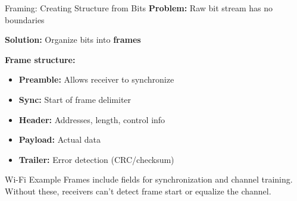 \documentclass[aspectratio=169,11pt]{beamer}
\begin{document}
\begin{frame}{Framing: Creating Structure from Bits}
    \textbf{Problem:} Raw bit stream has no boundaries
    
    \textbf{Solution:} Organize bits into \textbf{frames}
    
    \vspace{0.3cm}
    \textbf{Frame structure:}
    \begin{itemize}
        \item \textbf{Preamble:} Allows receiver to synchronize
        \item \textbf{Sync:} Start of frame delimiter
        \item \textbf{Header:} Addresses, length, control info
        \item \textbf{Payload:} Actual data
        \item \textbf{Trailer:} Error detection (CRC/checksum)
    \end{itemize}
    
    \vspace{0.3cm}
    \begin{exampleblock}{Wi-Fi Example}
        Frames include fields for synchronization and channel training. Without these, receivers can't detect frame start or equalize the channel.
    \end{exampleblock}
\end{frame}
\end{document}
